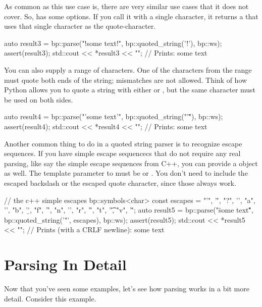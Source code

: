 \documentclass{MyBook}
\begin{document}
As common as this use case is, there are very similar use cases that it does not cover. So,  has some options. If you call it with a single character, it returns a  that uses that single character as the quote-character.

\begin{code}
auto result3 = bp::parse("!some text!", bp::quoted_string('!'), bp::ws);
assert(result3);
std::cout << *result3 << "\n"; // Prints: some text
\end{code}

You can also supply a range of characters. One of the characters from the range must quote both ends of the string; mismatches are not allowed. Think of how Python allows you to quote a string with either  or , but the same character must be used on both sides.

\begin{code}
auto result4 = bp::parse("'some text'", bp::quoted_string("'\""), bp::ws);
assert(result4);
std::cout << *result4 << "\n"; // Prints: some text
\end{code}

Another common thing to do in a quoted string parser is to recognize escape sequences. If you have simple escape sequencecs that do not require any real parsing, like say the simple escape sequences from C++, you can provide a  object as well. The template parameter  to  must be  or . You don't need to include the escaped backslash or the escaped quote character, since those always work.

\begin{code}
// the c++ simple escapes
bp::symbols<char> const escapes = {
    {"'", '\''},
    {"?", '\?'},
    {"a", '\a'},
    {"b", '\b'},
    {"f", '\f'},
    {"n", '\n'},
    {"r", '\r'},
    {"t", '\t'},
    {"v", '\v'}};
auto result5 =
    bp::parse("\"some text\r\"", bp::quoted_string('"', escapes), bp::ws);
assert(result5);
std::cout << *result5 << "\n"; // Prints (with a CRLF newline): some text
\end{code}

\section{Parsing In Detail}

Now that you've seen some examples, let's see how parsing works in a bit more detail. Consider this example.
\end{document}
